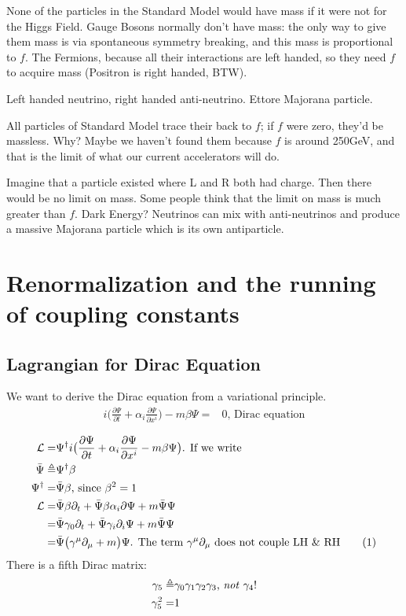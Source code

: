 \documentclass[]{article}
\newcommand\numberthis{\addtocounter{equation}{1}\tag{\theequation}}
\begin{document}
None of the particles in the Standard Model would have mass if it were not for the Higgs Field. Gauge Bosons normally don't have mass: the only way to give them mass is via spontaneous symmetry breaking, and this mass is proportional to $f$. The Fermions, because all their interactions are left handed, so they need $f$ to acquire mass (Positron is right handed, BTW).

Left handed neutrino, right handed anti-neutrino. Ettore Majorana particle.

All particles of Standard Model trace their back to $f$; if $f$ were zero, they'd be massless. Why? Maybe we haven't found them because $f$ is around 250GeV, and that is the limit of what our current accelerators will do.

Imagine that a particle existed where L and R both had charge. Then there would be no limit on mass. Some people think that the limit on mass is much greater than $f$. Dark Energy?
Neutrinos can mix with anti-neutrinos and produce a massive Majorana particle which is its own antiparticle.

\section{Renormalization and the running of coupling constants}

\subsection{Lagrangian for Dirac Equation}

We want to derive the Dirac equation from a variational principle.
 \begin{align*}
	i \big(\frac{\partial \Psi}{\partial t} + \alpha_i \frac{\partial \Psi}{\partial 	x^i}\big) -m \beta \Psi =&0 \text{,  Dirac equation}
\end{align*}

\begin{align*}
	\mathcal{L}=&\Psi^\dagger i \big(\frac{\partial \Psi}{\partial t} + \alpha_i \frac{\partial \Psi}{\partial 	x^i} -m \beta \Psi\big)\text{. If we write}\\
	\bar{\Psi} \triangleq&\Psi^\dagger \beta  \\
	\Psi^\dagger  =& \bar{\Psi} \beta \text{, since $\beta^2=1$}\\
	\mathcal{L} =& \bar{\Psi}\beta \partial_t + \bar{\Psi}\beta \alpha_i \partial \Psi +m \bar{\Psi}  \Psi\\
	=& \bar{\Psi}\gamma_0 \partial_t + \bar{\Psi}\gamma_i \partial_i \Psi +m \bar{\Psi}  \Psi\\
	=& \bar{\Psi}\big(\gamma^\mu \partial_\mu +m  \big) \Psi \text{. The term $\gamma^\mu \partial_\mu$ does not couple LH \& RH} \numberthis \label{eq:dirac:lagrange}
\end{align*}
There is a fifth Dirac matrix:
\begin{align*}
	\gamma_5 \triangleq & \gamma_0 \gamma_1 \gamma_2 \gamma_3 \text{, \emph{not} $\gamma_4$!}\\
	\gamma_5^2 =&1
\end{align*}
\end{document}
